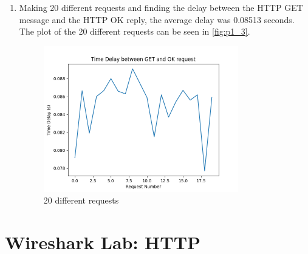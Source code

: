 \documentclass{article}
\begin{document}
\begin{enumerate}
    \item Making 20 different requests and finding the delay between the HTTP GET message and the HTTP OK reply, the average delay was 0.08513 seconds. The plot of the 20 different requests can be seen in \autoref{fig:p1_3}.
    
    \begin{figure}[ht!]
        \centering
        \includegraphics[width=0.8\textwidth]{p1_3}
        \caption{20 different requests}
        \label{fig:p1_3}
    \end{figure}
\end{enumerate}

\newpage
\section{Wireshark Lab: HTTP}
\end{document}
